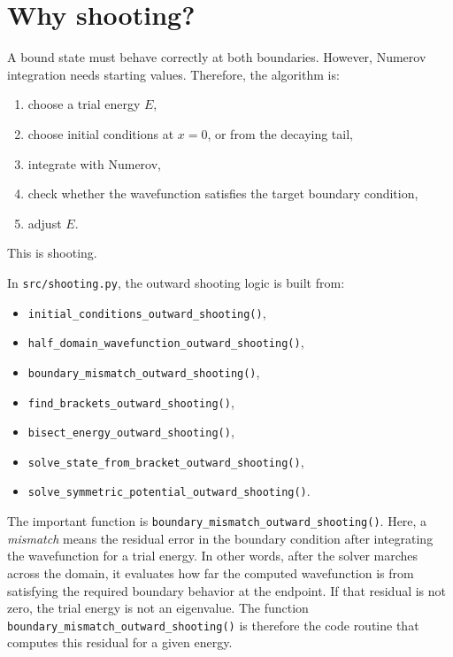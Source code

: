 \documentclass[11pt]{article}
\begin{document}
    \section{Why shooting?}

    A bound state must behave correctly at both boundaries. However, Numerov integration needs starting values. Therefore, the algorithm is:
    \begin{enumerate}
        \item choose a trial energy $E$,
        \item choose initial conditions at $x=0$, or from the decaying tail,
        \item integrate with Numerov,
        \item check whether the wavefunction satisfies the target boundary condition,
        \item adjust $E$.
    \end{enumerate}

    This is shooting.

    In \texttt{src/shooting.py}, the outward shooting logic is built from:
    \begin{itemize}
        \item \texttt{initial\_conditions\_outward\_shooting()},
        \item \texttt{half\_domain\_wavefunction\_outward\_shooting()},
        \item \texttt{boundary\_mismatch\_outward\_shooting()},
        \item \texttt{find\_brackets\_outward\_shooting()},
        \item \texttt{bisect\_energy\_outward\_shooting()},
        \item \texttt{solve\_state\_from\_bracket\_outward\_shooting()},
        \item \texttt{solve\_symmetric\_potential\_outward\_shooting()}.
    \end{itemize}

    The important function is \texttt{boundary\_mismatch\_outward\_shooting()}. Here, a \emph{mismatch} means the residual error in the boundary condition after integrating the wavefunction for a trial energy. In other words, after the solver marches across the domain, it evaluates how far the computed wavefunction is from satisfying the required boundary behavior at the endpoint. If that residual is not zero, the trial energy is not an eigenvalue. The function \texttt{boundary\_mismatch\_outward\_shooting()} is therefore the code routine that computes this residual for a given energy.
\end{document}

